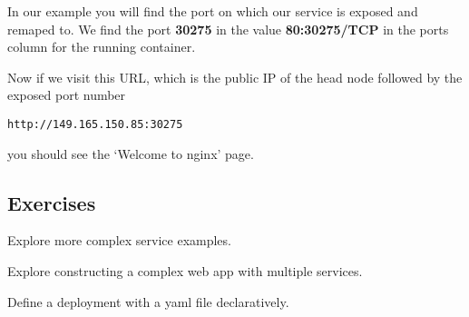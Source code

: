 In our example you will find the port on which our service is exposed
and remaped to. We find the port \textbf{30275} in the value
\textbf{80:30275/TCP} in the ports column for the running container.

Now if we visit this URL, which is the public IP of the head node
followed by the exposed port number

\begin{lstlisting}
http://149.165.150.85:30275
\end{lstlisting}

you should see the `Welcome to nginx' page.

\subsection{Exercises}

\begin{exercise}
Explore more complex service examples.
\end{exercise}

\begin{exercise}
Explore constructing a complex web app with multiple services.
\end{exercise}

\begin{exercise}
Define a deployment with a yaml file declaratively.
\end{exercise}

